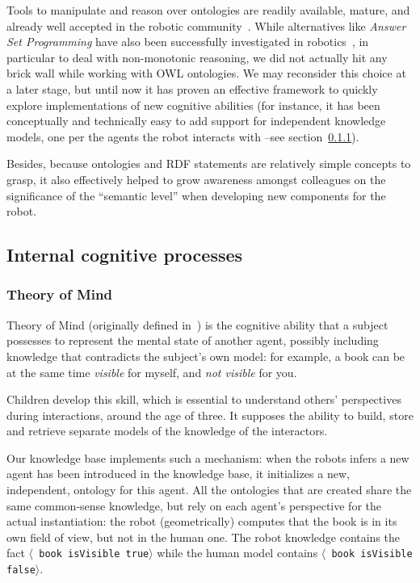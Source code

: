 \documentclass[preprint,5p]{elsarticle}
\newcommand{\stmt}[1]{{\footnotesize \tt $\langle$ #1\relax$\rangle$}}
\begin{document}
Tools to manipulate and reason over ontologies are readily available, mature,
and already well accepted in the robotic community~\cite{Tenorth2009a,
Lim2011}. While alternatives like \emph{Answer Set Programming} have also been
successfully investigated in robotics~\cite{Chen2010,Erdem2012}, in particular
to deal with non-monotonic reasoning, we did not actually hit any brick wall
while working with OWL ontologies. We may reconsider this choice at a later
stage, but until now it has proven an effective framework to quickly explore
implementations of new cognitive abilities (for instance, it has been
conceptually and technically easy to add support for independent knowledge
models, one per the agents the robot interacts with --see
section~\ref{sect|tom}).

Besides, because ontologies and RDF statements are relatively simple concepts
to grasp, it also effectively helped to grow awareness amongst colleagues on
the significance of the ``semantic level'' when developing new components for
the robot.

\subsection{Internal cognitive processes}
\label{sect|intern}

\subsubsection{Theory of Mind}
\label{sect|tom}

Theory of Mind (originally defined in~\cite{Premack1978}) is the cognitive
ability that a subject possesses to represent the mental state of another
agent, possibly including knowledge that contradicts the subject's own model: for
example, a book can be at the same time \emph{visible} for myself, and \emph{not
visible} for you.

Children develop this skill, which is essential to understand others' perspectives during
interactions, around the age of three. It supposes the
ability to build, store and retrieve separate models of the knowledge of the
interactors.

Our knowledge base implements such a mechanism: when the robots infers a new
agent has been introduced in the knowledge base, it initializes a new,
independent, ontology for this agent. All the ontologies that are created share
the same common-sense knowledge, but rely on each agent's perspective for the
actual instantiation: the robot (geometrically) computes that the book is in
its own field of view, but not in the human one. The robot knowledge contains
the fact \stmt{book isVisible true} while the human model contains \stmt{book
isVisible false}.
\end{document}
